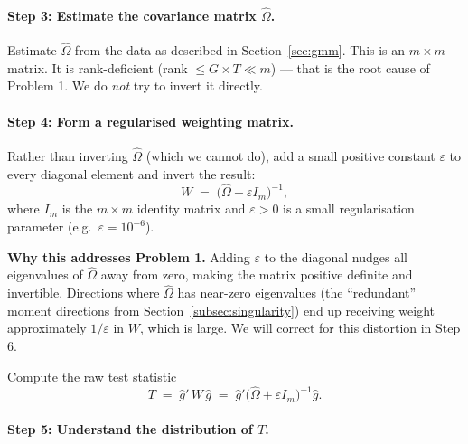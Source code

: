 \paragraph{Step 3: Estimate the covariance matrix $\hat\Omega$.}

Estimate $\hat\Omega$ from the data as described in
Section~\ref{sec:gmm}.  This is an $m\times m$ matrix.  It is
rank-deficient (rank $\leq G\times T \ll m$) --- that is the root cause
of Problem 1.  We do \emph{not} try to invert it directly.

\paragraph{Step 4: Form a regularised weighting matrix.}

Rather than inverting $\hat\Omega$ (which we cannot do), add a small
positive constant $\varepsilon$ to every diagonal element and invert
the result:
\begin{equation}
  W \;=\; \bigl(\hat\Omega + \varepsilon I_m\bigr)^{-1},
  \label{eq:reg_inv}
\end{equation}
where $I_m$ is the $m\times m$ identity matrix and $\varepsilon > 0$
is a small regularisation parameter (e.g.\ $\varepsilon = 10^{-6}$).

\medskip
\noindent\textbf{Why this addresses Problem 1.}
Adding $\varepsilon$ to the diagonal nudges all eigenvalues of
$\hat\Omega$ away from zero, making the matrix positive definite and
invertible.  Directions where $\hat\Omega$ has near-zero eigenvalues
(the ``redundant'' moment directions from Section~\ref{subsec:singularity})
end up receiving weight approximately $1/\varepsilon$ in $W$, which is
large.  We will correct for this distortion in Step 6.

\medskip
\noindent Compute the raw test statistic
\begin{equation}
  T \;=\; \hat g'\,W\,\hat g
        \;=\; \hat g'\bigl(\hat\Omega + \varepsilon I_m\bigr)^{-1}\hat g.
  \label{eq:raw_stat}
\end{equation}

\paragraph{Step 5: Understand the distribution of $T$.}

